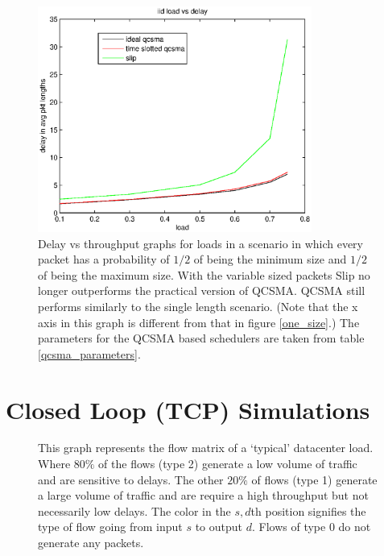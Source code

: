 \documentclass{IEEEtran}%
\begin{document}
\begin{figure}%
	 \includegraphics[width=90mm]{vs_load.eps}
	 \caption{Delay vs throughput graphs for loads in a scenario in which every packet has a probability of $1/2$ of being the minimum size and $1/2$ of being the maximum size. With the variable sized packets Slip no longer outperforms the practical version of QCSMA.  QCSMA still performs similarly to the single length scenario.  (Note that the x axis in this graph is different from that in figure \ref{one_size}.) The parameters for the QCSMA based schedulers are taken from table \ref{qcsma_parameters}.} 	
	\label{variable_size}
\end{figure}

\section{Closed Loop (TCP) Simulations} \label{closed}
\begin{figure}%
	\caption{This graph represents the flow matrix of a `typical' datacenter load.  Where $80\%$ of the flows (type 2) generate a low volume of traffic and are sensitive to delays.  The other $20\%$ of flows (type 1) generate a large volume of traffic and are require a high throughput but not necessarily low delays.  The color in the $s,d$th position signifies the type of flow going from input $s$ to output $d$.  Flows of type $0$ do not generate any packets.} 	
	\label{typical_flows}
\end{figure}
\end{document}
